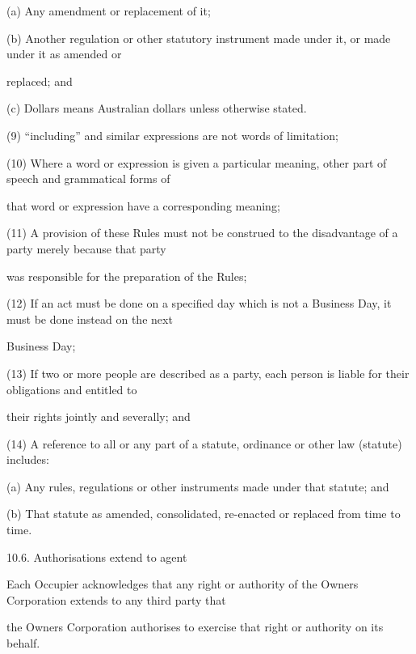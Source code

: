 \documentclass{article}
\begin{document}
{\fontsize{9.962}{1}(a) Any amendment or replacement of it; }

{\fontsize{9.962}{1}(b) Another regulation or other statutory instrument made under it, or made under it as amended or }

{\fontsize{10.02}{1}replaced; and }

{\fontsize{9.962}{1}(c) Dollars means Australian dollars unless otherwise stated. }

{\fontsize{9.962}{1}(9) “including” and similar expressions are not words of limitation; }

{\fontsize{9.962}{1}(10) Where a word or expression is given a particular meaning, other part of speech and grammatical forms of }

{\fontsize{10.02}{1}that word or expression have a corresponding meaning; }

{\fontsize{9.962}{1}(11) A provision of these Rules must not be construed to the disadvantage of a party merely because that party }

{\fontsize{10.02}{1}was responsible for the preparation of the Rules; }

{\fontsize{9.962}{1}(12) If an act must be done on a specified day which is not a Business Day, it must be done instead on the next }

{\fontsize{10.02}{1}Business Day; }

{\fontsize{9.962}{1}(13) If two or more people are described as a party, each person is liable for their obligations and entitled to }

{\fontsize{10.02}{1}their rights jointly and severally; and }

{\fontsize{9.962}{1}(14) A reference to all or any part of a statute, ordinance or other law (statute) includes: }

{\fontsize{9.962}{1}(a) Any rules, regulations or other instruments made under that statute; and }

{\fontsize{9.962}{1}(b) That statute as amended, consolidated, re-enacted or replaced from time to time. }

{\fontsize{9.99}{1}10.6. Authorisations extend to agent }

{\fontsize{10.02}{1}Each Occupier acknowledges that any right or authority of the Owners Corporation extends to any third party that }

{\fontsize{10.02}{1}the Owners Corporation authorises to exercise that right or authority on its behalf. }

\newpage
\end{document}
